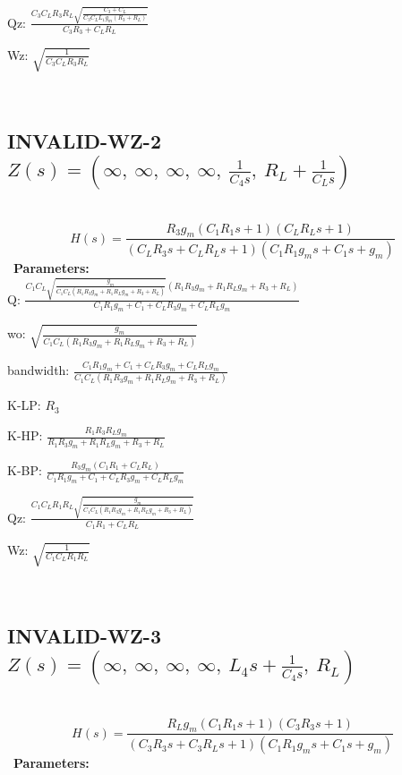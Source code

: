 \documentclass{article}
\begin{document}
Qz: $\frac{C_{3} C_{L} R_{3} R_{L} \sqrt{\frac{C_{3} + C_{L}}{C_{3} C_{L} L_{1} g_{m} \left(R_{3} + R_{L}\right)}}}{C_{3} R_{3} + C_{L} R_{L}}$\ 

Wz: $\sqrt{\frac{1}{C_{3} C_{L} R_{3} R_{L}}}$\ 

\ 

\subsection{INVALID-WZ-2 $Z(s) = \left( \infty, \  \infty, \  \infty, \  \infty, \  \frac{1}{C_{4} s}, \  R_{L} + \frac{1}{C_{L} s}\right)$ } \ 
\textbf{\[H(s) = \frac{R_{3} g_{m} \left(C_{1} R_{1} s + 1\right) \left(C_{L} R_{L} s + 1\right)}{\left(C_{L} R_{3} s + C_{L} R_{L} s + 1\right) \left(C_{1} R_{1} g_{m} s + C_{1} s + g_{m}\right)}\] } \ 
\textbf{Parameters:}\\ 

Q: $\frac{C_{1} C_{L} \sqrt{\frac{g_{m}}{C_{1} C_{L} \left(R_{1} R_{3} g_{m} + R_{1} R_{L} g_{m} + R_{3} + R_{L}\right)}} \left(R_{1} R_{3} g_{m} + R_{1} R_{L} g_{m} + R_{3} + R_{L}\right)}{C_{1} R_{1} g_{m} + C_{1} + C_{L} R_{3} g_{m} + C_{L} R_{L} g_{m}}$\ 

wo: $\sqrt{\frac{g_{m}}{C_{1} C_{L} \left(R_{1} R_{3} g_{m} + R_{1} R_{L} g_{m} + R_{3} + R_{L}\right)}}$\ 

bandwidth: $\frac{C_{1} R_{1} g_{m} + C_{1} + C_{L} R_{3} g_{m} + C_{L} R_{L} g_{m}}{C_{1} C_{L} \left(R_{1} R_{3} g_{m} + R_{1} R_{L} g_{m} + R_{3} + R_{L}\right)}$\ 

K-LP: $R_{3}$\ 

K-HP: $\frac{R_{1} R_{3} R_{L} g_{m}}{R_{1} R_{3} g_{m} + R_{1} R_{L} g_{m} + R_{3} + R_{L}}$\ 

K-BP: $\frac{R_{3} g_{m} \left(C_{1} R_{1} + C_{L} R_{L}\right)}{C_{1} R_{1} g_{m} + C_{1} + C_{L} R_{3} g_{m} + C_{L} R_{L} g_{m}}$\ 

Qz: $\frac{C_{1} C_{L} R_{1} R_{L} \sqrt{\frac{g_{m}}{C_{1} C_{L} \left(R_{1} R_{3} g_{m} + R_{1} R_{L} g_{m} + R_{3} + R_{L}\right)}}}{C_{1} R_{1} + C_{L} R_{L}}$\ 

Wz: $\sqrt{\frac{1}{C_{1} C_{L} R_{1} R_{L}}}$\ 

\ 

\subsection{INVALID-WZ-3 $Z(s) = \left( \infty, \  \infty, \  \infty, \  \infty, \  L_{4} s + \frac{1}{C_{4} s}, \  R_{L}\right)$ } \ 
\textbf{\[H(s) = \frac{R_{L} g_{m} \left(C_{1} R_{1} s + 1\right) \left(C_{3} R_{3} s + 1\right)}{\left(C_{3} R_{3} s + C_{3} R_{L} s + 1\right) \left(C_{1} R_{1} g_{m} s + C_{1} s + g_{m}\right)}\] } \ 
\textbf{Parameters:}\\ 
\end{document}
